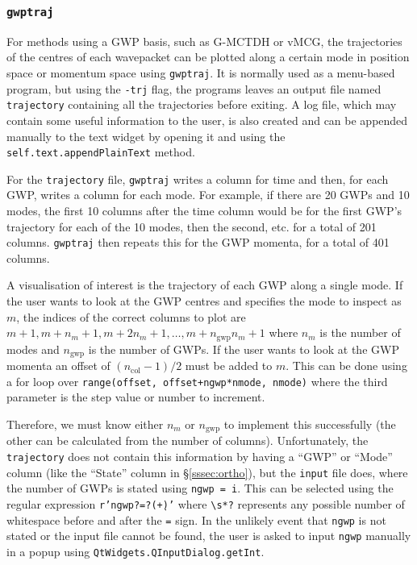 \documentclass[12pt]{article}
\begin{document}
\subsubsection{\texttt{gwptraj}}\label{sssec:gwptraj}

For methods using a GWP basis, such as G-MCTDH or vMCG, the trajectories of the centres of each wavepacket can be plotted along a certain mode in position space or momentum space using \texttt{gwptraj}. It is normally used as a menu-based program, but using the \texttt{-trj} flag, the programs leaves an output file named \texttt{trajectory} containing all the trajectories before exiting. A log file, which may contain some useful information to the user, is also created and can be appended manually to the text widget by opening it and using the \texttt{self.text.appendPlainText} method.

For the \texttt{trajectory} file, \texttt{gwptraj} writes a column for time and then, for each GWP, writes a column for each mode. For example, if there are 20 GWPs and 10 modes, the first 10 columns after the time column would be for the first GWP's trajectory for each of the 10 modes, then the second, etc. for a total of 201 columns. \texttt{gwptraj} then repeats this for the GWP momenta, for a total of 401 columns.

A visualisation of interest is the trajectory of each GWP along a single mode. If the user wants to look at the GWP centres and specifies the mode to inspect as \(m\), the indices of the correct columns to plot are \(m+1, m+n_m+1, m+2n_m+1, \dots, m+n_{\text{gwp}}n_m+1\) where \(n_m\) is the number of modes and \(n_{\text{gwp}}\) is the number of GWPs. If the user wants to look at the GWP momenta an offset of \((n_{\text{col}}-1)/2\) must be added to \(m\). This can be done using a for loop over \texttt{range(offset, offset+ngwp*nmode, nmode)} where the third parameter is the step value or number to increment.

Therefore, we must know either \(n_m\) or \(n_{\text{gwp}}\) to implement this successfully (the other can be calculated from the number of columns). Unfortunately, the \texttt{trajectory} does not contain this information by having a ``GWP'' or ``Mode'' column (like the ``State'' column in \S\ref{sssec:ortho}), but the \texttt{input} file does, where the number of GWPs is stated using \texttt{ngwp = i}. This can be selected using the regular expression \texttt{r'ngwp\s*?=\s*?(\d+)'} where \texttt{\textbackslash{}s*?} represents any possible number of whitespace before and after the \texttt{=} sign. In the unlikely event that \texttt{ngwp} is not stated or the input file cannot be found, the user is asked to input \texttt{ngwp} manually in a popup using \texttt{QtWidgets.QInputDialog.getInt}.
\end{document}
